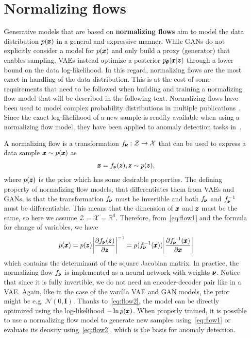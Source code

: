 \section{Normalizing flows} \label{sec:flow_models}
Generative models that are based on \textbf{normalizing flows} aim to model the data distribution $p(\pmb{{x}})$ in a general and expressive manner. While GANs do not explicitly consider a model for $p(\pmb{{x}})$ and only build a proxy (generator) that enables sampling, VAEs instead optimize a posterior $p_{\pmb{{\theta}}}(\pmb{{x}}|\pmb{{z}})$ through a lower bound on the data log-likelihood. In this regard, normalizing flows are the most  exact in handling of the data distribution. This is at the cost of some requirements that need to be followed when building and training a normalizing flow model that will be described in the following text. Normalizing flows have been used to model complex probability distributions in multiple publications~\cite{dinh2014nice,rezende2015variational,kingma2016improved,jin2022pfvae}. Since the exact log-likelihood of a new sample is readily available when using a normalizing flow model, they have been applied to anomaly detection tasks in~\cite{yamaguchi2019adaflow, schmidtNormalizingFlowsNovelty2019, diasAnomalyDetectionTrajectory2020a, pevny2020sum,rudolph2022fully}.

A normalizing flow is a transformation $f_{\pmb{{\nu}}}:\mathcal{Z} \rightarrow \mathcal{X}$ that can be used to express a data sample $\pmb{{x}} \sim p(\pmb{{x}})$ as
\begin{equation} \label{eq:flow1}
    \pmb{{x}} = f_{\pmb{{\nu}}}(\pmb{{z}}), \pmb{{z}} \sim p(\pmb{{z}}),
\end{equation}
where $p(\pmb{{z}})$ is the prior which has some desirable properties. The defining property of normalizing flow models, that differentiates them from VAEs and GANs, is that the transformation $f_{\pmb{{\nu}}}$ must be invertible and both $f_{\pmb{{\nu}}}$ and $f_{\pmb{{\nu}}}^{-1}$ must be differentiable. This means that the dimension of $\pmb{{x}}$ and $\pmb{{z}}$ must be the same, so here we assume $\mathcal{Z} = \mathcal{X} = \mathbb{R}^d$. Therefore, from~\eqref{eq:flow1} and the formula for change of variables, we have
\begin{equation} \label{eq:flow2}
    p(\vc{x}) = p(\vc{z}) \left\vert \frac{\partial f_{\vc{\nu}}(\vc{z})}{\partial \vc{z}} \right\vert ^{-1} = p(f^{-1}_{\vc{\nu}}(\vc{x})) \left\vert \frac{\partial f^{-1}_{\vc{\nu}}(\vc{x})}{\partial \vc{x}} \right\vert 
\end{equation}
which contains the determinant of the square Jacobian matrix. In practice, the normalizing flow $f_{\pmb{{\nu}}}$ is implemented as a neural network with weights $\pmb{{\nu}}$. Notice that since it is fully invertible, we do not need an encoder-decoder pair like in a VAE. Again, like in the case of the vanilla VAE and GAN models, the prior might be e.g. $\mathcal{N}(0,\textbf{I})$. Thanks to~\eqref{eq:flow2}, the model can be directly optimized using the log-likelihood $- \ln p(\pmb{{x}})$. When properly trained, it is possible to use a normalizing flow model to generate new samples using~\eqref{eq:flow1} or evaluate its density using~\eqref{eq:flow2}, which is the basis for anomaly detection.

